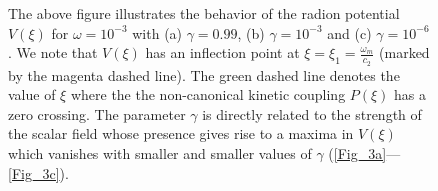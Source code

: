 \documentclass{article}
\begin{document}
\begin{figure}[t!]
\centering
{\hspace{-1.5cm}~~
\hspace{2.cm} }\\
{\hspace{-2.cm}}~~
\caption{The above figure illustrates the behavior of the radion potential $V(\xi)$ for $\omega=10^{-3}$ with (a) $\gamma=0.99$, (b) $\gamma=10^{-3}$ and (c) $\gamma=10^{-6}$. We note that $V(\xi)$ has an inflection point at $\xi=\xi_1=\frac{\omega_m}{c_2}$ (marked by the magenta dashed line). The green dashed line denotes the value of $\xi$ where the the non-canonical kinetic coupling $P(\xi)$ has a zero crossing.
The parameter $\gamma$ is directly related to the strength of the scalar field whose presence gives rise to a maxima in $V(\xi)$ which vanishes with smaller and smaller values of $\gamma$ (\ref{Fig_3a}---\ref{Fig_3c}).  
}
\label{Fig_03}
\end{figure}
\end{document}
